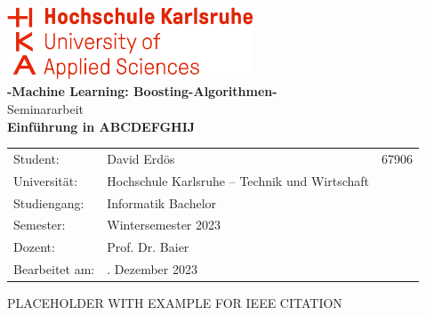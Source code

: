 \documentclass[11pt]{article}
\begin{document}
\begin{titlepage}
    \begin{center}
        \includegraphics[width=0.55\textwidth]{Images/Template/HsKa_new.png}\\[16ex]
        \huge{\textbf{-Machine Learning: Boosting-Algorithmen-}\\Seminararbeit}\\[8ex]
        \LARGE{\textbf{Einführung in ABCDEFGHIJ}}\\[14ex]
        \normalsize{}
        \begin{tabular}{lll}
            Student:            & \quad David Erdös                               & 67906 \\[2ex]     %
            Universität:        & \quad Hochschule Karlsruhe – Technik und Wirtschaft   &       \\[2ex]
            Studiengang:        & \quad Informatik Bachelor             &       \\[2ex]
            Semester:           & \quad Wintersemester 2023                             &       \\[2ex]
            Dozent:             & \quad Prof. Dr. Baier                       &       \\[2ex]
            Bearbeitet am:      & \quad 1. Dezember 2023                             &       \\[2ex]
        \end{tabular}
    \end{center}
\end{titlepage}
\newpage
\tableofcontents
\newpage
{}









PLACEHOLDER WITH EXAMPLE FOR IEEE CITATION \cite{einstein}

\newpage                                          
\printbibliography[heading= bibintoc, title={Literaturverzeichnis}]
\newpage
\listoffigures
{}
\newpage
\listoftables
{}
\end{document}
